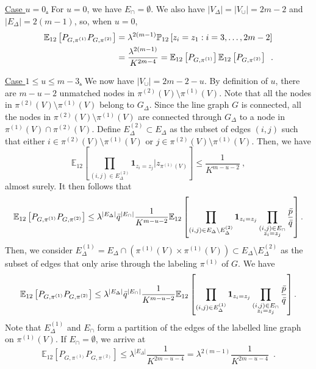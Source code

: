 \documentclass[final]{colt2026}
\newcommand{\1}{\mathbf{1}}
\newcommand{\bbE}{\mathbb{E}}
\newcommand{\bbP}{\mathbb{P}}
\newcommand{\cro}[1]{\left[#1\right]}
\begin{document}
\noindent\underline{Case $u=0$.} For $u=0$, we have   $E_{\cap}=\emptyset$. We also have $|V_{\Delta}|=|V_{\cup}|=2m-2$ and $|E_{\Delta}|=2(m-1)$, so,
  when $u=0$,
\begin{align} \nonumber
\bbE_{12}\cro{P_{G,\pi^{(1)}}P_{G,\pi^{(2)}}} & = \lambda^{2(m-1)} \bbP_{12}\cro{z_{i}=z_{1}:i=3,\ldots, 2m-2}\nonumber\\
& = {\lambda^{2(m-1)} \over K^{2m-4}}= \label{eq:upper_cross_u:0}
\bbE_{12}\cro{P_{G,\pi^{(1)}}}\bbE_{12}\cro{P_{G,\pi^{(2)}}}\enspace .
\end{align}
\smallskip

\noindent\underline{Case $1\leq u\leq m-3$.}
We now have $|V_{\cup}|=2m-2-u$.
By definition of $u$, there are $m-u-2$ unmatched nodes in $\pi^{(2)}(V)\setminus \pi^{(1)}(V)$. Note that all the nodes in $\pi^{(2)}(V)\setminus \pi^{(1)}(V)$ belong to $G_{\Delta}$. Since the line graph $G$ is connected, all the nodes in $\pi^{(2)}(V)\setminus \pi^{(1)}(V)$ are connected through $G_{\Delta}$ to a node in $\pi^{(1)}(V)\cap \pi^{(2)}(V)$. Define $E_{\Delta}^{(2)}\subset E_{\Delta}$ as the subset of edges $(i,j)$ such that either $i\in \pi^{(2)}(V)\setminus \pi^{(1)}(V)$ or $j\in \pi^{(2)}(V)\setminus \pi^{(1)}(V)$. Then, we have 
\[
\bbE_{12}\left[\prod_{(i,j)\in E^{(2)}_{\Delta} } \mathbf 1_{z_{i}=z_{j}}  | z_{\pi^{(1)}(V)}  \right] \leq \frac{1}{K^{m-u-2}} \ , 
\]
almost surely. It then follows that 
\[
\bbE_{12}\cro{P_{G,\pi^{(1)}}P_{G,\pi^{(2)}}}\leq \lambda^{|E_{\Delta}|} \bar q^{|E_{\cap}|}\frac{1}{K^{m-u-2}}
 \bbE_{12}\cro{\prod_{(i,j)\in E_{\Delta}\setminus  E^{(2)}_{\Delta} }\mathbf 1_{z_{i}=z_{j}}\prod_{\substack{(i,j)\in E_{\cap}\\ z_{i}=z_{j}}}{\bar p\over \bar q}}.
 \]
Then, we consider $E_{\Delta}^{(1)}= E_{\Delta} \cap (\pi^{(1)}(V)\times \pi^{(1)}(V))\subset E_{\Delta}\setminus  E^{(2)}_{\Delta}$ as the subset of edges
that only arise through the labeling $\pi^{(1)}$ of $G$. We have 
\begin{align}\label{eq:upper_E_12}
\bbE_{12}\cro{P_{G,\pi^{(1)}}P_{G,\pi^{(2)}}}\leq \lambda^{|E_{\Delta}|} \bar q^{|E_{\cap}|}\frac{1}{K^{m-u-2}}
 \bbE_{12}\cro{\prod_{(i,j)\in E^{(1)}_{\Delta} }\mathbf 1_{z_{i}=z_{j}}\prod_{\substack{(i,j)\in E_{\cap}\\ z_{i}=z_{j}}}{\bar p\over \bar q}}.
\end{align}
Note that $E^{(1)}_{\Delta}$ and $E_{\cap}$ form a partition of the edges of the labelled line graph on $\pi^{(1)}(V)$. If $E_{\cap}=\emptyset$, we arrive at 
\[
\bbE_{12}\cro{P_{G,\pi^{(1)}}P_{G,\pi^{(2)}}}\leq \lambda^{|E_{\Delta}|} \frac{1}{K^{2m-u-4}}= \lambda^{2(m-1)} \frac{1}{K^{2m-u-4}} \enspace . 
\]
\end{document}

